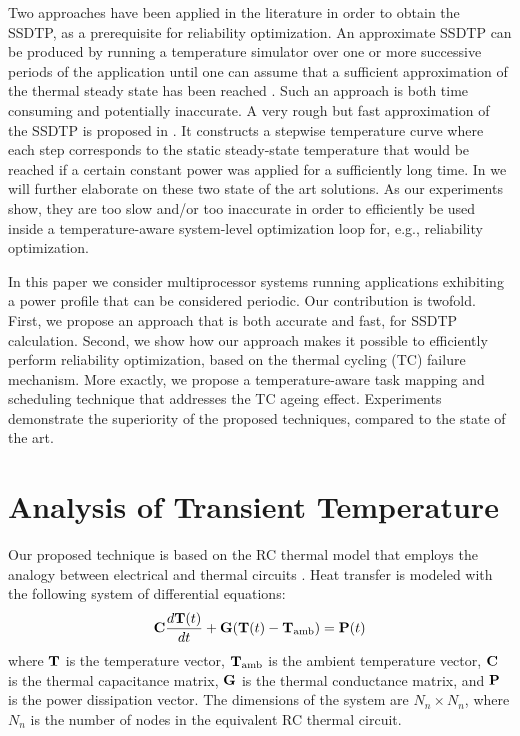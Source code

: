 Two approaches have been applied in the literature in order to obtain the SSDTP,
as a prerequisite for reliability optimization. An approximate SSDTP can be
produced by running a temperature simulator over one or more successive periods
of the application until one can assume that a sufficient approximation of the
thermal steady state has been reached \cite{srinivasan2004}. Such an approach is
both time consuming and potentially inaccurate. A very rough but fast
approximation of the SSDTP is proposed in \cite{huang2009}. It constructs a
stepwise temperature curve where each step corresponds to the static
steady-state temperature that would be reached if a certain constant power was
applied for a sufficiently long time. In  we will further
elaborate on these two state of the art solutions. As our experiments show, they
are too slow and/or too inaccurate in order to efficiently be used inside a
temperature-aware system-level optimization loop for, e.g., reliability
optimization.

In this paper we consider multiprocessor systems running applications exhibiting
a power profile that can be considered periodic. Our contribution is twofold.
First, we propose an approach that is both accurate and fast, for SSDTP
calculation. Second, we show how our approach makes it possible to efficiently
perform reliability optimization, based on the thermal cycling (TC) failure
mechanism. More exactly, we propose a temperature-aware task mapping and
scheduling technique that addresses the TC ageing effect. Experiments
demonstrate the superiority of the proposed techniques, compared to the state of
the art.

\section{Analysis of Transient Temperature} 

Our proposed technique is based on the RC thermal model that employs the analogy
between electrical and thermal circuits \cite{kreith2000}. Heat transfer is
modeled with the following system of differential equations:
\begin{equation} \elab{fourier-model}
  \m{C} \frac{d\v{T}(t)}{dt} + \m{G} (\v{T}(t) - \v{T}_\text{amb}) = \v{P}(t)
\end{equation}
where $\mathbf{T}$ is the temperature vector, $\mathbf{T}_{\mathrm{amb}}$ is the ambient
temperature vector, $\mathbf{C}$ is the thermal capacitance matrix, $\mathbf{G}$ is the
thermal conductance matrix, and $\mathbf{P}$ is the power dissipation vector. The
dimensions of the system are \mbox{$N_n \times N_n$}, where $N_n$ is the number
of nodes in the equivalent RC thermal circuit.

